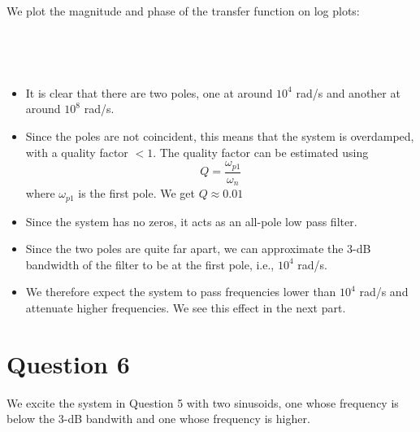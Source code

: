 \documentclass[11pt]{article}
\begin{document}
	

	

	
		
    We plot the magnitude and phase of the transfer function on log plots:

	

	

    \begin{center}
    \end{center}
    { \hspace*{\fill} \\}
    
    \begin{center}
    \end{center}
    { \hspace*{\fill} \\}
    
	
		
    \begin{itemize}
\item
  It is clear that there are two poles, one at around \(10^4\) rad/s and
  another at around \(10^8\) rad/s.
\item
  Since the poles are not coincident, this means that the system is
  overdamped, with a quality factor \(<1\). The quality factor can be
  estimated using \[Q = \frac{\omega_{p1}}{\omega_n}\] where
  \(\omega_{p1}\) is the first pole. We get \(Q \approx 0.01\)
\item
  Since the system has no zeros, it acts as an all-pole low pass filter.
\item
  Since the two poles are quite far apart, we can approximate the 3-dB
  bandwidth of the filter to be at the first pole, i.e., \(10^4\) rad/s.
\item
  We therefore expect the system to pass frequencies lower than \(10^4\)
  rad/s and attenuate higher frequencies. We see this effect in the next
  part.
\end{itemize}

	

	
		
    \section{Question 6}\label{question-6}

We excite the system in Question 5 with two sinusoids, one whose
frequency is below the 3-dB bandwith and one whose frequency is higher.
\end{document}
